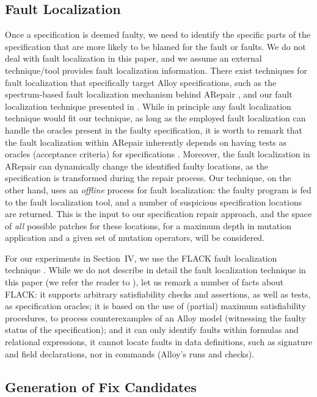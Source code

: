 \subsection{Fault Localization}

Once a specification is deemed faulty, we need to identify the specific parts of the specification that are more likely to be blamed for the fault or faults. We do not deal with fault localization in this paper, and we assume an external technique/tool provides fault localization information. There exist techniques for fault localization that specifically target Alloy specifications, such as the spectrum-based fault localization mechanism behind ARepair \cite{Wang+2018}, and our fault localization technique presented in \cite{Zheng+2021}. While in principle any fault localization technique would fit our technique, as long as the employed fault localization can handle the oracles present in the faulty specification, it is worth to remark that the fault localization within ARepair inherently depends on having tests as oracles (acceptance criteria) for specifications \cite{Wang+2018}. Moreover, the fault localization in ARepair can dynamically change the identified faulty locations, as the specification is transformed during the repair process. Our technique, on the other hand, uses an \emph{offline} process for fault localization: the faulty program is fed to the fault localization tool, and a number of suspicious specification locations are returned. This is the input to our specification repair approach, and the space of \emph{all} possible patches for these locations, for a maximum depth in mutation application and a given set of mutation operators, will be considered. 

For our experiments in Section~IV, we use the FLACK fault localization technique \cite{Zheng+2021}. While we do not describe in detail the fault localization technique in this paper (we refer the reader to \cite{Zheng+2021}), let us remark a number of facts about FLACK: it supports arbitrary satisfiability checks and assertions, as well as tests, as specification oracles; it is based on the use of (partial) maximum satisfiability procedures, to process counterexamples of an Alloy model (witnessing the faulty status of the specification); and it can only identify faults within formulas and relational expressions, it cannot locate faults in data definitions, such as signature and field declarations, nor in commands (Alloy's runs and checks). 

\subsection{Generation of Fix Candidates}

